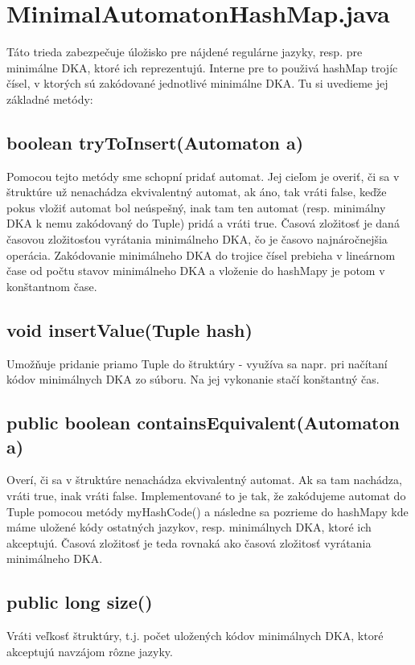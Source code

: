 \section{MinimalAutomatonHashMap.java}
Táto trieda zabezpečuje úložisko pre nájdené regulárne jazyky, resp. pre minimálne DKA, ktoré ich reprezentujú. Interne pre to použivá hashMap trojíc čísel, v ktorých sú zakódované jednotlivé minimálne DKA. Tu si uvedieme jej základné metódy:

\subsection*{boolean tryToInsert(Automaton a)}
Pomocou tejto metódy sme schopní pridať automat. Jej cieľom je overiť, či sa v štruktúre už nenachádza ekvivalentný automat, ak áno, tak vráti false, keďže pokus vložiť automat bol neúspešný, inak tam ten automat (resp. minimálny DKA k nemu zakódovaný do Tuple) pridá a vráti true. Časová zložitosť je daná časovou zložitosťou vyrátania minimálneho DKA, čo je časovo najnáročnejšia operácia. Zakódovanie minimálneho DKA do trojice čísel prebieha v lineárnom čase od počtu stavov minimálneho DKA a vloženie do hashMapy je potom v konštantnom čase.

\subsection*{void insertValue(Tuple hash)}
Umožňuje pridanie priamo Tuple do štruktúry - využíva sa napr. pri načítaní kódov minimálnych DKA zo súboru. Na jej vykonanie stačí konštantný čas.

\subsection*{public boolean containsEquivalent(Automaton a)}
Overí, či sa v štruktúre nenachádza ekvivalentný automat. Ak sa tam nachádza, vráti true, inak vráti false. Implementované to je tak, že zakódujeme automat do Tuple pomocou metódy myHashCode() a následne sa pozrieme do hashMapy kde máme uložené kódy ostatných jazykov, resp. minimálnych DKA, ktoré ich akceptujú. Časová zložitosť je teda rovnaká ako časová zložitosť vyrátania minimálneho DKA.

\subsection*{public long size()}
Vráti veľkosť štruktúry, t.j. počet uložených kódov minimálnych DKA, ktoré akceptujú navzájom rôzne jazyky.

